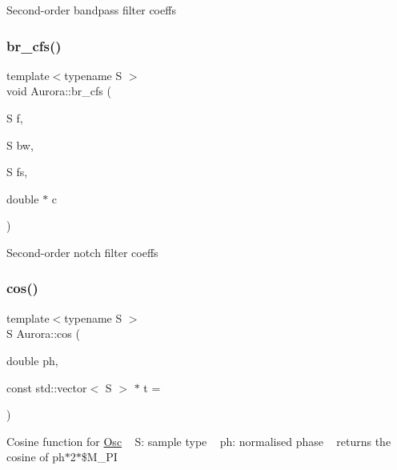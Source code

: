 Second-\/order bandpass filter coeffs \mbox{\label{namespace_aurora_afe0c9010d177c5be0aa923601d802111}} 
\subsubsection{\texorpdfstring{br\+\_\+cfs()}{br\_cfs()}}
{\footnotesize\ttfamily template$<$typename S $>$ \\
void Aurora\+::br\+\_\+cfs (\begin{DoxyParamCaption}\item[{S}]{f,  }\item[{S}]{bw,  }\item[{S}]{fs,  }\item[{double $\ast$}]{c }\end{DoxyParamCaption})\hspace{0.3cm}{\ttfamily [inline]}}

Second-\/order notch filter coeffs \mbox{\label{namespace_aurora_a0269c3758ab62d6a910cd8f7ace7fba2}} 
\subsubsection{\texorpdfstring{cos()}{cos()}}
{\footnotesize\ttfamily template$<$typename S $>$ \\
S Aurora\+::cos (\begin{DoxyParamCaption}\item[{double}]{ph,  }\item[{const std\+::vector$<$ S $>$ $\ast$}]{t = {} }\end{DoxyParamCaption})\hspace{0.3cm}{\ttfamily [inline]}}

Cosine function for \hyperlink{class_aurora_1_1_osc}{Osc} ~\newline
S\+: sample type ~\newline
ph\+: normalised phase ~\newline
returns the cosine of ph$\ast$2$\ast$\$\+M\+\_\+\+PI \mbox{\label{namespace_aurora_a35b9cf383290bddedd82b7c3d0f05e81}} 
